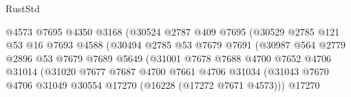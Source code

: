 \begin{lexlean}{RustStd}
\begin{coremodule}
                                      @4573
                                      @7695
                                      @4350
                                      @3168
                                      (@30524
                                        @2787
                                        @409
                                        @7695
                                        (@30529
                                          @2785
                                          @121
                                          @53
                                          @16
                                          @7693
                                          @4588
                                          (@30494
                                            @2785
                                            @53
                                            @7679
                                            @7691
                                            (@30987
                                              @564
                                              @2779
                                              @2896
                                              @53
                                              @7679
                                              @7689
                                              @5649
                                              (@31001
                                                @7678
                                                @7688
                                                @4700
                                                @7652
                                                @4706
                                                @31014
                                                (@31020
                                                  @7677
                                                  @7687
                                                  @4700
                                                  @7661
                                                  @4706
                                                  @31034
                                                  (@31043
                                                    @7670
                                                    @4706
                                                    @31049
                                                    @30554
                                                    @17270
                                                    (@16228 (@17272 @7671 @4573)))
                                                  @17270

\end{coremodule}
\end{lexlean}
